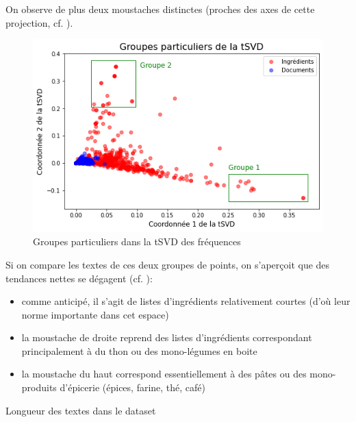             On observe de plus deux \og moustaches \fg distinctes (proches des axes de cette projection, cf. ).
            \begin{figure}[htbp]
                \begin{center}
                \includegraphics[width=0.9\linewidth]{img/tSVD_freq_groups.png}
                \end{center}
                \caption{Groupes particuliers dans la tSVD des fréquences}
                \label{fig:tSVD_freq_groups}
            \end{figure}    
            Si on compare les textes de ces deux groupes de points, on s'aperçoit que des tendances nettes se dégagent (cf. ):
            \begin{itemize}
                \item comme anticipé, il s'agit de listes d'ingrédients relativement courtes (d'où leur norme importante dans cet espace)
                \item la moustache de droite reprend des listes d'ingrédients correspondant principalement à du thon ou des mono-légumes en boite
                \item la moustache du haut correspond essentiellement à des pâtes ou des mono-produits d'épicerie (épices, farine, thé, café)        
            \end{itemize}           
            {\renewcommand{\arraystretch}{1.5}%
            \begin{table}[htbp]
                \begin{center}
                {\scriptsize
                
                }
                \caption{Longueur des textes dans le dataset}
                \label{tbl:tSVD_sample}
                \end{center}
            \end{table}
            }

            